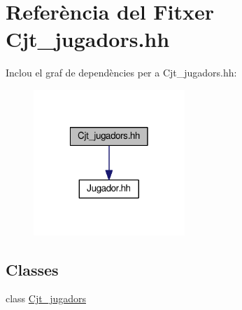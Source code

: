 \hypertarget{_cjt__jugadors_8hh}{}\section{Referència del Fitxer Cjt\+\_\+jugadors.\+hh}
\label{_cjt__jugadors_8hh}
Inclou el graf de dependències per a Cjt\+\_\+jugadors.\+hh\+:\nopagebreak
\begin{figure}[H]
\begin{center}
\leavevmode
\includegraphics[width=162pt]{_cjt__jugadors_8hh__incl}
\end{center}
\end{figure}
\subsection*{Classes}
\begin{DoxyCompactItemize}
\item 
class \mbox{\hyperlink{class_cjt__jugadors}{Cjt\+\_\+jugadors}}
\end{DoxyCompactItemize}
